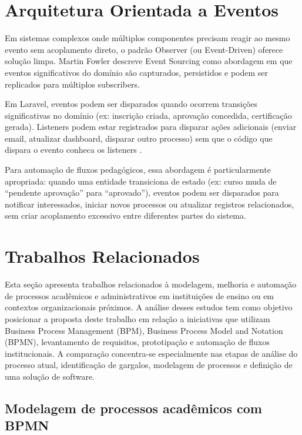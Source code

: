 \section{Arquitetura Orientada a Eventos}
\label{sec:revbib:events}

Em sistemas complexos onde múltiplos componentes precisam reagir ao mesmo evento
sem acoplamento direto, o padrão Observer (ou Event-Driven) oferece solução
limpa. Martin Fowler \cite{EventDrivenArchitecture2024} descreve Event Sourcing
como abordagem em que eventos significativos do domínio são capturados,
persistidos e podem ser replicados para múltiplos subscribers.

Em Laravel, eventos podem ser disparados quando ocorrem transições significativas
no domínio (ex: inscrição criada, aprovação concedida, certificação gerada).
Listeners podem estar registrados para disparar ações adicionais (enviar email,
atualizar dashboard, disparar outro processo) sem que o código que dispara o
evento conheca os listeners \cite{LaravelDocs2024}.

Para automação de fluxos pedagógicos, essa abordagem é particularmente apropriada:
quando uma entidade transiciona de estado (ex: curso muda de ``pendente
aprovação'' para ``aprovado''), eventos podem ser disparados para notificar
interessados, iniciar novos processos ou atualizar registros relacionados, sem
criar acoplamento excessivo entre diferentes partes do sistema.

\section{Trabalhos Relacionados}
\label{sec:trabalhos-relacionados}

Esta seção apresenta trabalhos relacionados à modelagem, melhoria e automação de processos
acadêmicos e administrativos em instituições de ensino ou em contextos organizacionais 
próximos. A análise desses estudos tem como objetivo posicionar a proposta deste trabalho 
em relação a iniciativas que utilizam Business Process Management (BPM), Business Process 
Model and Notation (BPMN), levantamento de requisitos, prototipação e automação de fluxos 
institucionais. A comparação concentra-se especialmente nas etapas de análise do processo 
atual, identificação de gargalos, modelagem de processos e definição de uma solução de software.

\subsection{Modelagem de processos acadêmicos com BPMN}
\label{sec:trabalhos-relacionados:bpmn-academico}

